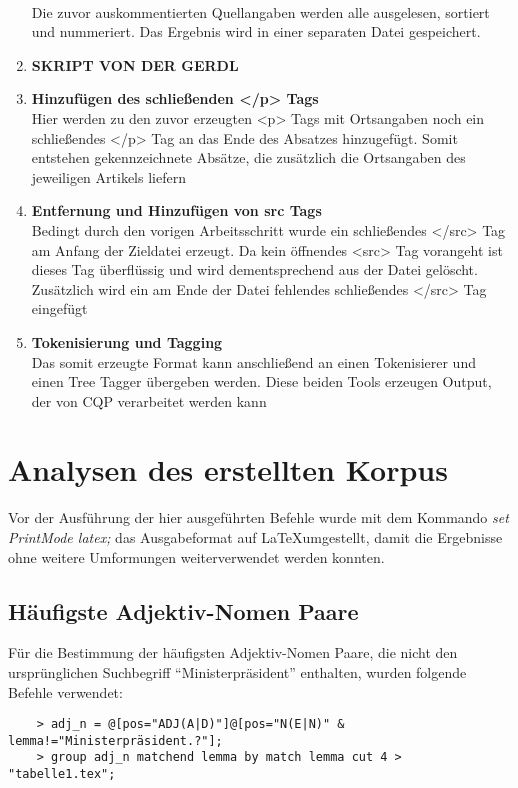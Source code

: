 \documentclass[%
	type=document,%
  	style=article,%
  	media=print,
  	pages=oneside,%
  	prefixLecturer=Dozenten:,
  	author=multiple,
]{unihildesheim}
\begin{document}
\begin{enumerate}
  \\ Die zuvor auskommentierten Quellangaben werden alle ausgelesen, sortiert
  und nummeriert. Das Ergebnis wird in einer separaten Datei gespeichert.
  \item \textbf{SKRIPT VON DER GERDL}
  \item \textbf{Hinzufügen des schließenden </p> Tags}
  \\ Hier werden zu den zuvor erzeugten <p> Tags mit Ortsangaben noch ein
  schließendes </p> Tag an das Ende des Absatzes hinzugefügt. Somit entstehen
  gekennzeichnete Absätze, die zusätzlich die Ortsangaben des jeweiligen
  Artikels liefern
  \item \textbf{Entfernung und Hinzufügen von src Tags}
  \\ Bedingt durch den vorigen Arbeitsschritt wurde ein schließendes </src> Tag
  am Anfang der Zieldatei erzeugt. Da kein öffnendes <src> Tag vorangeht ist
  dieses Tag überflüssig und wird dementsprechend aus der Datei gelöscht.
  Zusätzlich wird ein am Ende der Datei fehlendes schließendes </src> Tag
  eingefügt
  \item \textbf{Tokenisierung und Tagging}
  \\ Das somit erzeugte Format kann anschließend an einen Tokenisierer und einen
  Tree Tagger übergeben werden. Diese beiden Tools erzeugen Output, der von CQP
  verarbeitet werden kann
\end{enumerate}

\section{Analysen des erstellten Korpus}

Vor der Ausführung der hier ausgeführten Befehle wurde mit dem Kommando
\textit{set PrintMode latex;} das Ausgabeformat auf \LaTeX umgestellt, damit die
Ergebnisse ohne weitere Umformungen weiterverwendet werden konnten.


\subsection{Häufigste Adjektiv-Nomen Paare}
Für die Bestimmung der häufigsten Adjektiv-Nomen Paare, die nicht den
ursprünglichen Suchbegriff "`Ministerpräsident"' enthalten, wurden folgende
Befehle verwendet:
\begin{verbatim}
	> adj_n = @[pos="ADJ(A|D)"]@[pos="N(E|N)" & lemma!="Ministerpräsident.?"];
	> group adj_n matchend lemma by match lemma cut 4 > "tabelle1.tex";
\end{verbatim}
\end{document}
